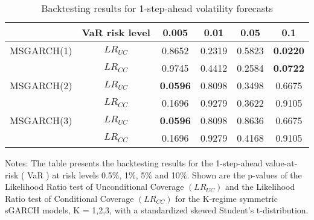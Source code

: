\documentclass[12pt,a4paper]{article}
\begin{document}
\begin{table}[]
\centering
\begin{threeparttable}
\caption {Backtesting results for 1-step-ahead volatility forecasts}
\label{table:backtest_ml}
\begin{tabular}{@{}lllclclclcl@{}}
\toprule
           & \multicolumn{2}{l}{VaR risk level} & \multicolumn{2}{c}{0.005}           & \multicolumn{2}{c}{0.01}   & \multicolumn{2}{c}{0.05}   & \multicolumn{2}{c}{0.1}             \\ \midrule
MSGARCH(1) & \multicolumn{2}{c}{$LR_{UC}$}      & \multicolumn{2}{c}{0.8652}          & \multicolumn{2}{c}{0.2319} & \multicolumn{2}{c}{0.5823} & \multicolumn{2}{c}{\textbf{0.0220}} \\
           & \multicolumn{2}{c}{$LR_{CC}$}      & \multicolumn{2}{c}{0.9745}          & \multicolumn{2}{c}{0.4412} & \multicolumn{2}{c}{0.2584} & \multicolumn{2}{c}{\textbf{0.0722}} \\
MSGARCH(2) & \multicolumn{2}{c}{$LR_{UC}$}      & \multicolumn{2}{c}{\textbf{0.0596}} & \multicolumn{2}{c}{0.8098} & \multicolumn{2}{c}{0.3498} & \multicolumn{2}{c}{0.6675}          \\
           & \multicolumn{2}{c}{$LR_{CC}$}      & \multicolumn{2}{c}{0.1696}          & \multicolumn{2}{c}{0.9279} & \multicolumn{2}{c}{0.3622} & \multicolumn{2}{c}{0.9105}          \\
MSGARCH(3) & \multicolumn{2}{c}{$LR_{UC}$}      & \multicolumn{2}{c}{\textbf{0.0596}} & \multicolumn{2}{c}{0.8098} & \multicolumn{2}{c}{0.8636} & \multicolumn{2}{c}{0.6675}          \\
           & \multicolumn{2}{c}{$LR_{CC}$}      & \multicolumn{2}{c}{0.1696}          & \multicolumn{2}{c}{0.9279} & \multicolumn{2}{c}{0.4168} & \multicolumn{2}{c}{0.9105}          \\ \bottomrule
\end{tabular}
\begin{tablenotes}
\small
\item Notes: The table presents the backtesting results for the 1-step-ahead value-at-risk ( VaR ) at risk levels 0.5$\%$, 1$\%$, 5$\%$ and 10$\%$. Shown are the p-values of the Likelihood Ratio test of Unconditional Coverage $(LR_{UC})$ and the Likelihood Ratio test of Conditional Coverage $(LR_{CC})$ for the K-regime symmetric sGARCH \citep{bollerslev1986generalized} models, K = 1,2,3, with a standardized skewed Student's t-distribution.
\end{tablenotes}
\end{threeparttable}
\end{table}
\end{document}
